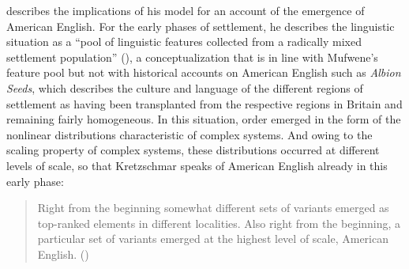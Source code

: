 \citet{Kretzschmar2015} describes the implications of his model for an account of the emergence of American English. For the early phases of settlement, he describes the linguistic situation as a “pool of linguistic features collected from a radically mixed settlement population” (\citeyear[251]{Kretzschmar2015}), a conceptualization that is in line with Mufwene’s feature pool but not with historical accounts on American English such as  \emph{Albion Seeds}, which describes the culture and language of the different regions of settlement as having been transplanted from the respective regions in Britain and remaining fairly homogeneous. In this situation, order emerged in the form of the nonlinear distributions characteristic of complex systems. And owing to the scaling property of complex systems, these distributions occurred at different levels of scale, so that Kretzschmar speaks of American English already in this early phase:

\begin{quote}
Right from the beginning somewhat different sets of variants emerged as top-ranked elements in different localities. Also right from the beginning, a particular set of variants emerged at the highest level of scale, American English. (\citeyear[257]{Kretzschmar2015})
\end{quote}


